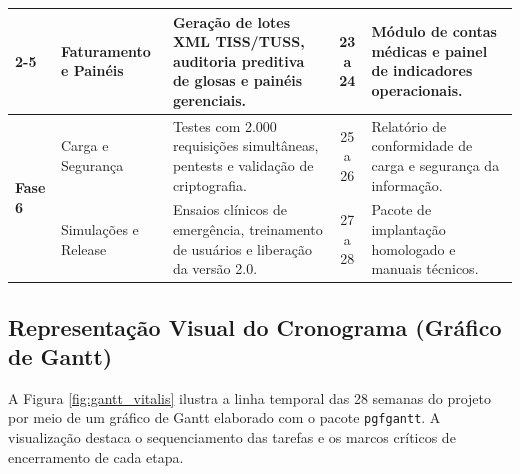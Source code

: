 \begin{table}[H]
\begin{tabularx}{\textwidth}{l >{\raggedright\arraybackslash}p{2.8cm} >{\raggedright\arraybackslash}X c >{\raggedright\arraybackslash}p{3.5cm}}
\cmidrule(lr){2-5}
 & Faturamento e Painéis & Geração de lotes XML TISS/TUSS, auditoria preditiva de glosas e painéis gerenciais. & 23 a 24 & Módulo de contas médicas e painel de indicadores operacionais. \\
\midrule
\multirow{2}{*}{\textbf{Fase 6}} & Carga e Segurança & Testes com 2.000 requisições simultâneas, pentests e validação de criptografia. & 25 a 26 & Relatório de conformidade de carga e segurança da informação. \\
\cmidrule(lr){2-5}
 & Simulações e Release & Ensaios clínicos de emergência, treinamento de usuários e liberação da versão 2.0. & 27 a 28 & Pacote de implantação homologado e manuais técnicos. \\
\bottomrule
\end{tabularx}
\end{table}

\subsection{Representação Visual do Cronograma (Gráfico de Gantt)}

A Figura \ref{fig:gantt_vitalis} ilustra a linha temporal das 28 semanas do projeto por meio de um gráfico de Gantt elaborado com o pacote \texttt{pgfgantt}. A visualização destaca o sequenciamento das tarefas e os marcos críticos de encerramento de cada etapa.

